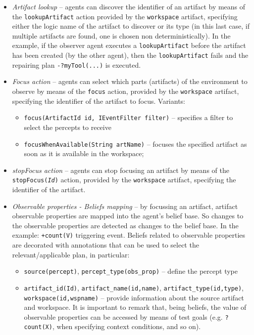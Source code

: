 \documentclass[11pt]{report}
\newcommand\code[1]{{\small{\mbox{\texttt{{#1}}}}}}
\begin{document}
\begin{itemize}
%
\item \emph{Artifact lookup} -- agents can discover the identifier of an artifact by means of the \code{lookupArtifact} action provided by the \code{workspace} artifact, specifying either the logic name of the artifact to discover or its type (in this last case, if multiple artifacts are found, one is chosen non deterministically).
%
In the example, if the observer agent executes a \code{lookupArtifact} before the artifact has been created (by the other agent), then the \code{lookupArtifact} fails and the repairing plan \code{-?myTool(...)} is executed.

\item \emph{Focus action} -- agents can select which parts (artifacts) of the environment to observe by means of the \code{focus} action, provided by the \code{workspace} artifact, specifying the identifier of the artifact to focus.
%
Variants:
\begin{itemize}
\item \code{focus(ArtifactId id, IEventFilter filter)} -- specifies a filter to select the percepts to receive
\item \code{focusWhenAvailable(String artName)} -- focuses the specified artifact as soon as it is available in the workspace;
\end{itemize}
%
\item \emph{stopFocus action} -- agents can stop focusing an artifact by means of the \code{stopFocus(\emph{Id})} action, provided by the \code{workspace} artifact, specifying the identifier of the artifact.
%
\item \emph{Observable properties - Beliefs mapping} -- by focussing an artifact, artifact observable properties are mapped into the agent's belief base. So changes to the observable properties are detected as changes to the belief base.
%
In the example: \code{+count(V)} triggering event.
%
Beliefs related to observable properties are decorated with annotations that can be used to select the relevant/applicable plan, in particular:
\begin{itemize}
\item \code{source(percept)}, \code{percept\_type(obs\_prop)} -- define the percept type
\item \code{artifact\_id(Id)}, \code{artifact\_name(id,name)}, \code{artifact\_type(id,type)}, \code{workspace(id,wspname)} -- provide information about the source artifact and workspace.
%
It is important to remark that, being beliefs, the value of observable properties can be accessed by means of test goals (e.g. \code{?count(X)}, when specifying context conditions, and so on).


\end{itemize}
\end{itemize}
\end{document}
